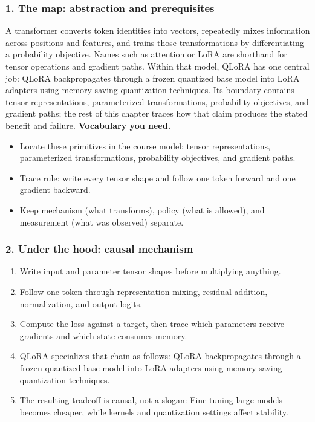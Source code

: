 \subsubsection*{1. The map: abstraction and prerequisites}
A transformer converts token identities into vectors, repeatedly mixes information across positions and features, and trains those transformations by differentiating a probability objective. Names such as attention or LoRA are shorthand for tensor operations and gradient paths.
Within that model, QLoRA has one central job: QLoRA backpropagates through a frozen quantized base model into LoRA adapters using memory-saving quantization techniques. Its boundary contains tensor representations, parameterized transformations, probability objectives, and gradient paths; the rest of this chapter traces how that claim produces the stated benefit and failure.
\textbf{Vocabulary you need.}\begin{itemize}
\item Locate these primitives in the course model: tensor representations, parameterized transformations, probability objectives, and gradient paths.
\item Trace rule: write every tensor shape and follow one token forward and one gradient backward.
\item Keep mechanism (what transforms), policy (what is allowed), and measurement (what was observed) separate.
\end{itemize}
\subsubsection*{2. Under the hood: causal mechanism}\begin{enumerate}
\item Write input and parameter tensor shapes before multiplying anything.
\item Follow one token through representation mixing, residual addition, normalization, and output logits.
\item Compute the loss against a target, then trace which parameters receive gradients and which state consumes memory.
\item QLoRA specializes that chain as follows: QLoRA backpropagates through a frozen quantized base model into LoRA adapters using memory-saving quantization techniques.
\item The resulting tradeoff is causal, not a slogan: Fine-tuning large models becomes cheaper, while kernels and quantization settings affect stability.
\end{enumerate}
